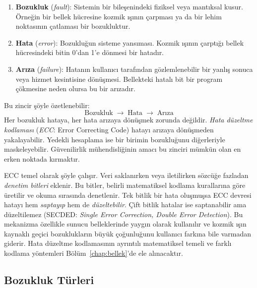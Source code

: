 \begin{enumerate}
    \item \textbf{Bozukluk} (\emph{fault}): Sistemin bir bileşenindeki fiziksel veya mantıksal kusur. Örneğin bir bellek hücresine kozmik ışının çarpması ya da bir lehim noktasının çatlaması bir bozukluktur.
    \item \textbf{Hata} (\emph{error}): Bozukluğun sisteme yansıması. Kozmik ışının çarptığı bellek hücresindeki bitin 0'dan 1'e dönmesi bir hatadır.
    \item \textbf{Arıza} (\emph{failure}): Hatanın kullanıcı tarafından gözlemlenebilir bir yanlış sonuca veya hizmet kesintisine dönüşmesi. Bellekteki hatalı bit bir program çökmesine neden olursa bu bir arızadır.
\end{enumerate}

Bu zincir şöyle özetlenebilir:
%
\[
\text{Bozukluk} \;\longrightarrow\; \text{Hata} \;\longrightarrow\; \text{Arıza}
\]
%
Her bozukluk hataya, her hata arızaya dönüşmek zorunda değildir. \emph{Hata düzeltme kodlaması} (\emph{ECC}: Error Correcting Code) hatayı arızaya dönüşmeden yakalayabilir. Yedekli hesaplama ise bir birimin bozukluğunu diğerleriyle maskeleyebilir. Güvenilirlik mühendisliğinin amacı bu zinciri mümkün olan en erken noktada kırmaktır.

ECC temel olarak şöyle çalışır. Veri saklanırken veya iletilirken sözcüğe fazladan \emph{denetim bitleri} eklenir. Bu bitler, belirli matematiksel kodlama kurallarına göre üretilir ve okuma sırasında denetlenir. Tek bitlik bir hata oluşmuşsa ECC devresi hatayı hem \emph{saptayıp} hem de \emph{düzeltebilir}. Çift bitlik hatalar ise saptanabilir ama düzeltilemez (SECDED: \emph{Single Error Correction, Double Error Detection}). Bu mekanizma özellikle sunucu belleklerinde yaygın olarak kullanılır ve kozmik ışın kaynaklı geçici bozuklukların büyük çoğunluğunu kullanıcı farkına bile varmadan giderir. Hata düzeltme kodlamasının ayrıntılı matematiksel temeli ve farklı kodlama yöntemleri Bölüm~\ref{chap:bellek}'de ele alınacaktır.

\subsection{Bozukluk Türleri}
\label{subsec:bozukluk-turleri}

